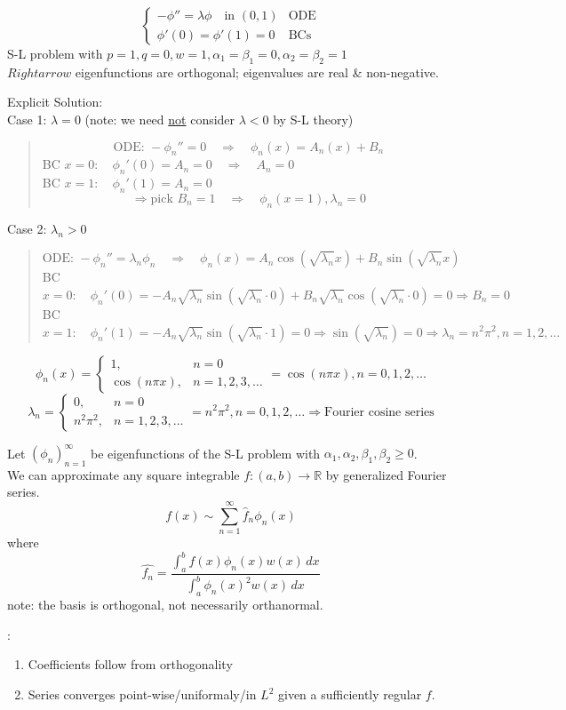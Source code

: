 \begin{example}
    \[\begin{cases*}
        -\phi'' = \lambda\phi \quad \text{in }(0,1) & \text{ODE} \\
        \phi'(0) = \phi'(1) = 0 &\text{BCs}
    \end{cases*}\]
    S-L problem with $p=1, q=0, w=1, \alpha_1 = \beta_1 = 0, \alpha_2 = \beta_2 = 1$
    \\$Rightarrow$ eigenfunctions are orthogonal; eigenvalues are real \& non-negative.

    Explicit Solution:
    \\Case 1: $\lambda = 0$ (note: we need \underline{not} consider $\lambda< 0$ by S-L theory)
    \begin{quote}
        \[\text{ODE: }-\phi_n'' = 0 \quad \Rightarrow \quad \phi_n(x) = A_n(x)+ B_n\]
        BC \@ $x=0: \quad \phi_n'(0) = A_n = 0 \quad \Rightarrow \quad A_n = 0$
        \\BC \@ $x=1: \quad \phi_n'(1) = A_n = 0$
        \[ \Rightarrow \text{pick }B_n = 1 \quad \Rightarrow \quad \phi_n(x = 1), \lambda_n = 0\]
    \end{quote}
    Case 2: $\lambda_n > 0$
    \begin{quote}
        \[\text{ODE: } -\phi_n'' = \lambda_n \phi_n \quad  \Rightarrow \quad \phi_n(x) = A_n\cos(\sqrt{\lambda_n}x) + B_n \sin(\sqrt{\lambda_n}x)\]
        BC \@ $x=0: \quad \phi_n'(0) = -A_n \sqrt{\lambda_n}\sin(\sqrt{\lambda_n}\cdot 0)+ B_n \sqrt{\lambda_n} \cos(\sqrt{\lambda_n}\cdot 0) = 0 \Rightarrow B_n = 0$
        \\BC \@ $x=1: \quad \phi_n'(1) = -A_n \sqrt{\lambda_n}\sin(\sqrt{\lambda_n}\cdot 1) = 0 \Rightarrow \sin(\sqrt{\lambda_n}) = 0\Rightarrow \lambda_n = n^2\pi^2, n = 1,2,\dots$
    \end{quote}

    \[\phi_n(x) = \begin{cases*}
        1, &n=0 \\
        \cos(n\pi x), &n=1,2,3, \dots
    \end{cases*} = \cos(n\pi x), n = 0,1,2, \dots \]
    \[\lambda_n = \begin{cases*}
        0, &n=0 \\
        n^2\pi^2, &n=1,2,3,\dots
    \end{cases*} = n^2\pi^2, n=0,1,2,\dots \Rightarrow \text{Fourier cosine series}\]
\end{example}

Let $(\phi_n)^{\infty}_{n=1}$ be eigenfunctions of the S-L problem with $\alpha_1, \alpha_2, \beta_1, \beta_2 \geq 0$.
\\We can approximate any square integrable $f: (a, b) \to \mathbb{R}$ by generalized Fourier series.
\[f(x) \sim \sum_{n=1}^{\infty}\hat{f}_n\phi_n(x)\]
where 
\[\hat{f_n} = \frac{\int_{a}^{b} f(x)\phi_n (x)w(x)\, dx}{\int_{a}^{b}\phi_n(x)^2w(x)\, dx}\]
note: the basis is orthogonal, not necessarily orthanormal.

:
\begin{enumerate}
    \item Coefficients follow from orthogonality
    \item Series converges point-wise/uniformaly/in $L^2$ given a sufficiently regular $f$.
\end{enumerate}

